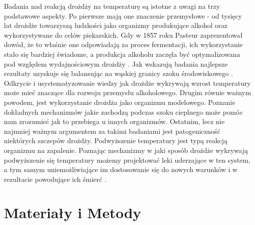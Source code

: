 \documentclass{pracamgr}
\begin{document}
Badania nad reakcją drożdży na temperaturę są istotne z uwagi na trzy podstawowe aspekty. Po pierwsze 
mają one znaczenie przemysłowe - od tysięcy lat drożdże towarzyszą ludzkości jako organizmy 
produkujące alkohol oraz wykorzystywane do celów piekarskich. Gdy w 1857 roku Pasteur 
zaprezentował dowód, że to właśnie one odpowiadają za proces fermentacji, ich wykorzystanie 
stało się bardziej świadome, a produkcja alkoholu zaczęła być optymalizowana 
pod względem wydajnościowym drożdży \cite{100years}. Jak wskazują badania najlepsze rezultaty 
uzyskuje się balansując na wąskiej granicy szoku środowiskowego \cite{Stresstolerance}. Odkrycie i usystematyzowanie wiedzy 
jak drożdże wykrywają wzrost temperatury może mieć znaczące dla rozwoju przemysłu alkoholowego. 
Drugim równie ważnym powodem, jest wykorzystanie drożdża jako organizmu modelowego. Poznanie dokładnych mechanizmów
jakie zachodzą podczas szoku cieplnego może pomóc nam zrozumieć jak to przebiega u innych organizmów. Ostatnim, lecz 
nie najmniej ważnym argumentem za takimi badaniami jest patogeniczność niektórych szczepów drożdży. 
Podwyższenie temperatury jest typą reakcją organizmu na zapalenie. Poznając mechanizmy w jaki sposób 
drożdże wykrywają podwyższenie się temperatury możemy projektować leki uderzające w ten system, a tym samym
uniemożliwiające im dostosowanie się do nowych warunków i w rezultacie powodujące ich śmierć \cite{Drugs}.





% 

\chapter{Materiały i Metody}
\end{document}
